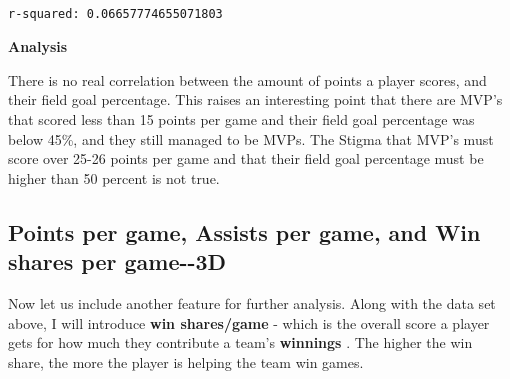 \documentclass[11pt]{article}
\begin{document}
    \begin{center}
    \end{center}
    { \hspace*{\fill} \\}
    
    \begin{Verbatim}[commandchars=\\\{\}]
r-squared: 0.06657774655071803

    \end{Verbatim}

    \textbf{Analysis} \newline

There is no real correlation between the amount of points a player
scores, and their field goal percentage. This raises an interesting
point that there are MVP's that scored less than 15 points per game and
their field goal percentage was below 45\%, and they still managed to be
MVPs. The Stigma that MVP's must score over 25-26 points per game and
that their field goal percentage must be higher than 50 percent is not
true.

\subsection{Points per game, Assists per game, and Win shares per
game-\/-3D}\label{points-per-game-assists-per-game-and-win-shares-per-game--3d}

Now let us include another feature for further analysis. Along with the
data set above, I will introduce \textbf{win shares/game} - which is the
overall score a player gets for how much they contribute a team's
\textbf{winnings} . The higher the win share, the more the player is
helping the team win games.
\end{document}
